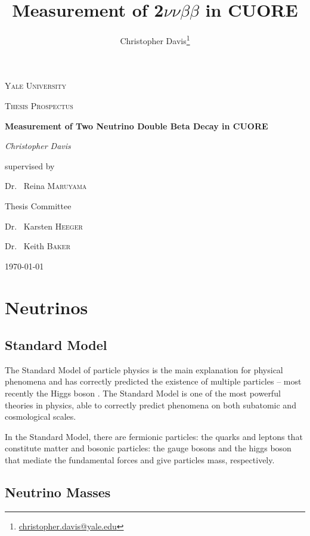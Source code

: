 \documentclass[12pt,a4paper]{article}
\author{Christopher Davis\thanks{\url{christopher.davis@yale.edu}}}
\title{Measurement of 2$\nu\nu\beta\beta$ in CUORE}
\begin{document}
\begin{titlepage}
\centering

{\scshape\LARGE Yale University \par}
\vspace{1 cm}
{\scshape\Large Thesis Prospectus \par}
\vspace{1.5 cm}
{\huge\bfseries Measurement of Two Neutrino Double Beta Decay in CUORE \par}
\vspace{2 cm}
{\Large\itshape Christopher Davis \par}
\vfill
supervised by \par
Dr. ~Reina \textsc{Maruyama}

\vfill
Thesis Committee \par
Dr. ~Karsten \textsc{Heeger} \par
Dr. ~Keith \textsc{Baker}

\vfill
{\large \today \par}
\end{titlepage}

\tableofcontents
\listoffigures

\doublespacing
\linenumbers

\section{Neutrinos}

\subsection{Standard Model}

The Standard Model of particle physics is the main explanation for physical phenomena and has correctly predicted the existence of multiple particles -- most recently the Higgs boson \cite{Aad:2012tfa}\cite{Chatrchyan:2012xdj}. The Standard Model is one of the most powerful theories in physics, able to correctly predict phenomena on both subatomic and cosmological scales.

In the Standard Model, there are fermionic particles: the quarks and leptons that constitute matter and bosonic particles: the gauge bosons and the higgs boson that mediate the fundamental forces and give particles mass, respectively. 

\subsection{Neutrino Masses}
\end{document}
